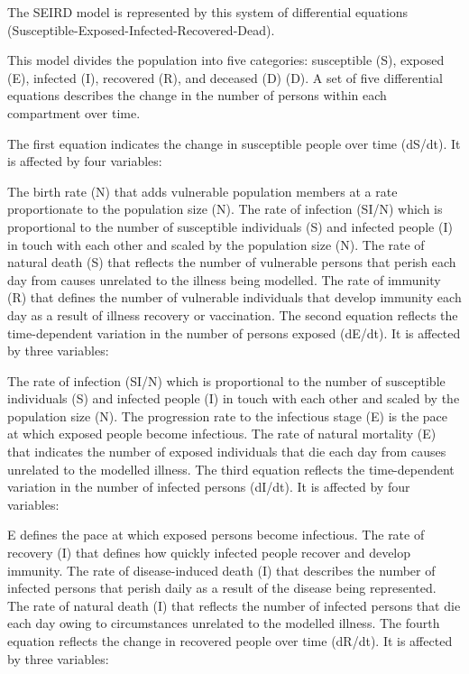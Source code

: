 \documentclass{article}
\begin{document}
The SEIRD model is represented by this system of differential equations (Susceptible-Exposed-Infected-Recovered-Dead).

This model divides the population into five categories: susceptible (S), exposed (E), infected (I), recovered (R), and deceased (D) (D). A set of five differential equations describes the change in the number of persons within each compartment over time.


The first equation indicates the change in susceptible people over time (dS/dt). It is affected by four variables:

The birth rate (N) that adds vulnerable population members at a rate proportionate to the population size (N).
The rate of infection (SI/N) which is proportional to the number of susceptible individuals (S) and infected people (I) in touch with each other and scaled by the population size (N).
The rate of natural death (S) that reflects the number of vulnerable persons that perish each day from causes unrelated to the illness being modelled.
The rate of immunity (R) that defines the number of vulnerable individuals that develop immunity each day as a result of illness recovery or vaccination.
The second equation reflects the time-dependent variation in the number of persons exposed (dE/dt). It is affected by three variables:

The rate of infection (SI/N) which is proportional to the number of susceptible individuals (S) and infected people (I) in touch with each other and scaled by the population size (N).
The progression rate to the infectious stage (E) is the pace at which exposed people become infectious.
The rate of natural mortality (E) that indicates the number of exposed individuals that die each day from causes unrelated to the modelled illness.
The third equation reflects the time-dependent variation in the number of infected persons (dI/dt). It is affected by four variables:

E defines the pace at which exposed persons become infectious.
The rate of recovery (I) that defines how quickly infected people recover and develop immunity.
The rate of disease-induced death (I) that describes the number of infected persons that perish daily as a result of the disease being represented.
The rate of natural death (I) that reflects the number of infected persons that die each day owing to circumstances unrelated to the modelled illness.
The fourth equation reflects the change in recovered people over time (dR/dt). It is affected by three variables:
\end{document}
